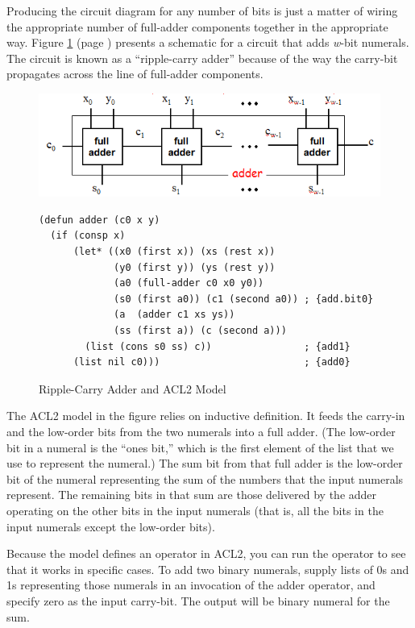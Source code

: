 Producing the circuit diagram for any number of bits
is just a matter of wiring the appropriate number of
full-adder components together in the appropriate way.
Figure \ref{fig:adder} (page \pageref{fig:adder}) presents a schematic 
for a circuit that adds \emph{w}-bit numerals.
The circuit is known as a ``ripple-carry adder'' because
of the way the carry-bit propagates across the line
of full-adder components.

\begin{figure}
\begin{center}
\includegraphics[scale=0.25]{Images/adder.png}
\begin{Verbatim}
(defun adder (c0 x y)
  (if (consp x)
      (let* ((x0 (first x)) (xs (rest x))
             (y0 (first y)) (ys (rest y))
             (a0 (full-adder c0 x0 y0))
             (s0 (first a0)) (c1 (second a0)) ; {add.bit0}
             (a  (adder c1 xs ys))
             (ss (first a)) (c (second a)))
        (list (cons s0 ss) c))                ; {add1}
      (list nil c0)))                         ; {add0}
\end{Verbatim}
\end{center}
\caption{Ripple-Carry Adder and ACL2 Model}
\label{fig:adder}
\end{figure}

The ACL2 model in the figure relies
on inductive definition. It feeds the carry-in and
the low-order bits from the two numerals into a full adder.
(The low-order bit in a numeral is the ``ones bit,''
which is the first element of the list that we use to
represent the numeral.)
The sum bit from that full adder
is the low-order bit of the numeral representing the sum of
the numbers that the input numerals represent.
The remaining bits in that sum are those delivered by
the adder operating on the other bits in the input numerals
(that is, all the bits in the input numerals except the low-order bits).

Because the model defines an operator in ACL2,
you can run the operator to see that it works in specific cases.
To add two binary numerals, supply lists of 0s and 1s
representing those numerals in an invocation
of the adder operator, and specify zero as the input carry-bit.
The output will be binary numeral for the sum.

